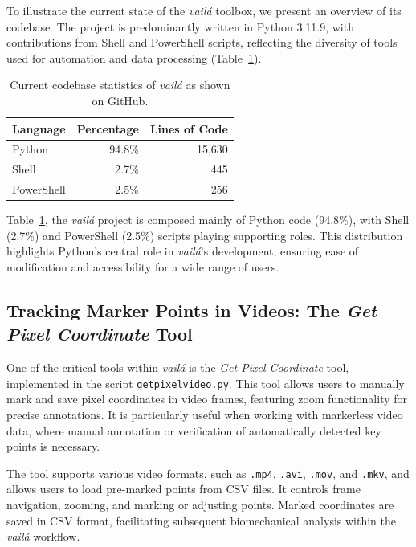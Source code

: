 \documentclass{article}
\begin{document}
To illustrate the current state of the \textit{vailá} toolbox, we present an overview of its codebase. The project is predominantly written in Python 3.11.9, with contributions from Shell and PowerShell scripts, reflecting the diversity of tools used for automation and data processing (Table~\ref{tab:code_stats}).

\begin{table}[htbp]
    \centering
    \caption{Current codebase statistics of \textit{vailá} as shown on GitHub.}
    \label{tab:code_stats}
    \begin{tabular}{lrr}
        \toprule
        \textbf{Language} & \textbf{Percentage} & \textbf{Lines of Code} \\
        \midrule
        Python      & 94.8\%  & 15,630 \\
        Shell       & 2.7\%   & 445   \\
        PowerShell  & 2.5\%   & 256   \\
        \bottomrule
    \end{tabular}
\end{table}

Table~\ref{tab:code_stats}, the \textit{vailá} project is composed mainly of Python code (94.8\%), with Shell (2.7\%) and PowerShell (2.5\%) scripts playing supporting roles. This distribution highlights Python's central role in \textit{vailá}'s development, ensuring ease of modification and accessibility for a wide range of users.

\subsection{Tracking Marker Points in Videos: The \textit{Get Pixel Coordinate} Tool}

One of the critical tools within \textit{vailá} is the \textit{Get Pixel Coordinate} tool, implemented in the script \texttt{getpixelvideo.py}. This tool allows users to manually mark and save pixel coordinates in video frames, featuring zoom functionality for precise annotations. It is particularly useful when working with markerless video data, where manual annotation or verification of automatically detected key points is necessary.

The tool supports various video formats, such as \texttt{.mp4}, \texttt{.avi}, \texttt{.mov}, and \texttt{.mkv}, and allows users to load pre-marked points from CSV files. It controls frame navigation, zooming, and marking or adjusting points. Marked coordinates are saved in CSV format, facilitating subsequent biomechanical analysis within the \textit{vailá} workflow.
\end{document}
